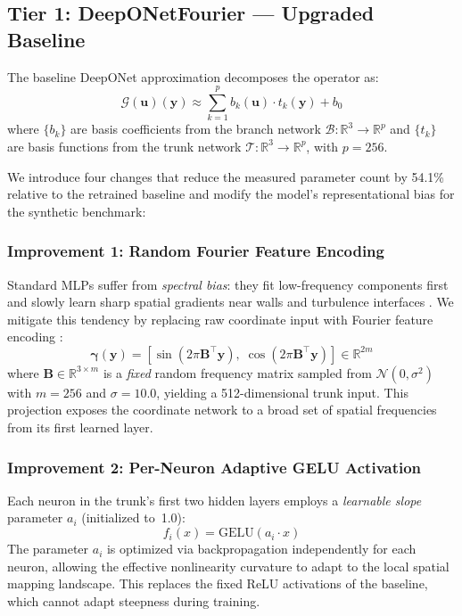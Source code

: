 \documentclass[journal]{IEEEtran}
\newcommand{\added}[1]{#1}
\begin{document}
\subsection{Tier 1: DeepONetFourier --- Upgraded Baseline}
\label{sec:deeponet_fourier}

The baseline DeepONet approximation \cite{lu2021deeponet, chen1995} decomposes the operator as:
\begin{equation}
\mathcal{G}(\bm{u})(\bm{y}) \approx \sum_{k=1}^{p} b_k(\bm{u}) \cdot t_k(\bm{y}) + b_0
\label{eq:deeponet_base}
\end{equation}
where $\{b_k\}$ are basis coefficients from the branch network $\mathcal{B}: \mathbb{R}^3 \to \mathbb{R}^p$ and $\{t_k\}$ are basis functions from the trunk network $\mathcal{T}: \mathbb{R}^3 \to \mathbb{R}^p$, with $p = 256$.

We introduce four changes that reduce the measured parameter count by \added{54.1\%} relative to the retrained baseline and modify the model's representational bias for the synthetic benchmark:

\subsubsection{Improvement 1: Random Fourier Feature Encoding}
Standard MLPs suffer from \emph{spectral bias}: they fit low-frequency components first and slowly learn sharp spatial gradients near walls and turbulence interfaces \cite{rahaman2019spectral}. \added{We mitigate this tendency} by replacing raw coordinate input with Fourier feature encoding \cite{tancik2020ffn}:
\begin{equation}
\bm{\gamma}(\bm{y}) = \left[\sin(2\pi \bm{B}^{\top}\bm{y}),\;\cos(2\pi \bm{B}^{\top}\bm{y})\right] \in \mathbb{R}^{2m}
\label{eq:fourier}
\end{equation}
where $\bm{B} \in \mathbb{R}^{3 \times m}$ is a \emph{fixed} random frequency matrix sampled from $\mathcal{N}(0, \sigma^2)$ with $m = 256$ and $\sigma = 10.0$, yielding a 512-dimensional trunk input. This projection exposes the coordinate network to a broad set of spatial frequencies from its first learned layer.

\subsubsection{Improvement 2: Per-Neuron Adaptive GELU Activation}
Each neuron in the trunk's first two hidden layers employs a \emph{learnable slope} parameter $a_i$ (initialized to~1.0):
\begin{equation}
f_i(x) = \text{GELU}(a_i \cdot x)
\label{eq:adaptive_gelu}
\end{equation}
The parameter $a_i$ is optimized via backpropagation independently for each neuron, allowing the effective nonlinearity curvature to adapt to the local spatial mapping landscape. This replaces the fixed ReLU activations of the baseline, which cannot adapt steepness during training.
\end{document}
